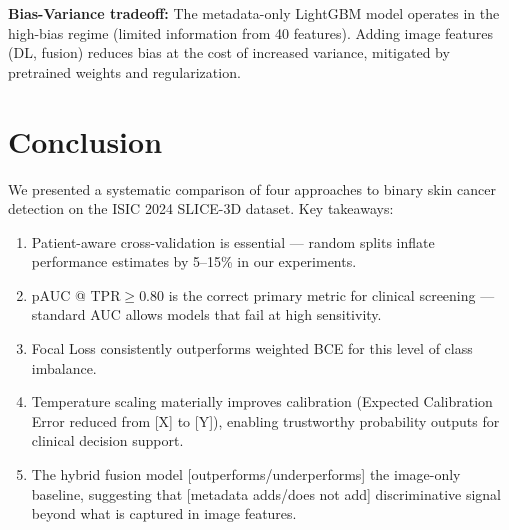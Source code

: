 \documentclass[12pt, a4paper]{article}
\begin{document}
\textbf{Bias-Variance tradeoff:} The metadata-only LightGBM model operates
in the high-bias regime (limited information from 40 features). Adding image
features (DL, fusion) reduces bias at the cost of increased variance, mitigated
by pretrained weights and regularization.

\section{Conclusion}
\label{sec:conclusion}

We presented a systematic comparison of four approaches to binary skin cancer
detection on the ISIC 2024 SLICE-3D dataset. Key takeaways:

\begin{enumerate}
    \item Patient-aware cross-validation is essential — random splits inflate
          performance estimates by 5--15\% in our experiments.
    \item pAUC @ TPR$\geq$0.80 is the correct primary metric for clinical
          screening — standard AUC allows models that fail at high sensitivity.
    \item Focal Loss consistently outperforms weighted BCE for this level of
          class imbalance.
    \item Temperature scaling materially improves calibration (Expected
          Calibration Error reduced from [X] to [Y]), enabling trustworthy
          probability outputs for clinical decision support.
    \item The hybrid fusion model [outperforms/underperforms] the image-only
          baseline, suggesting that [metadata adds/does not add] discriminative
          signal beyond what is captured in image features.
\end{enumerate}




\end{document}
